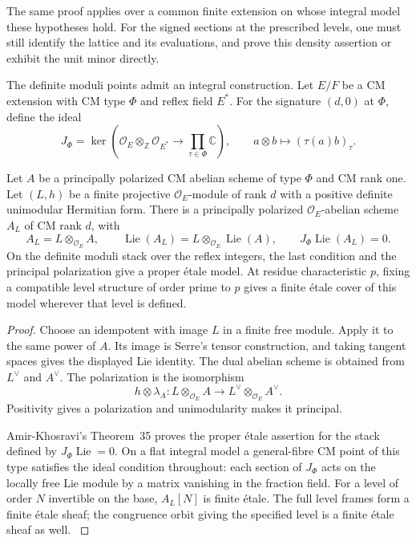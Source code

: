 The same proof applies over a common finite extension on whose integral
model these hypotheses hold. For the signed sections at the prescribed
levels, one must still identify the lattice and its evaluations, and
prove this density assertion or exhibit the unit minor directly.

The definite moduli points admit an integral construction. Let \(E/F\)
be a CM extension with CM type \(\Phi\) and reflex field \(E^*\).
For the signature \((d,0)\) at \(\Phi\), define the ideal
\[
 J_\Phi=\ker\!\left(\mathcal O_E\otimes_{\mathbb Z}\mathcal O_{E^*}
             \longrightarrow\prod_{\tau\in\Phi}\mathbb C\right),
 \qquad a\otimes b\longmapsto(\tau(a)b)_\tau .
\]

\begin{auxlemma}\label{lem:marked-definite-cm-points}
Let \(A\) be a principally polarized CM abelian scheme of type \(\Phi\)
and CM rank one. Let \((L,h)\) be a finite projective
\(\mathcal O_E\)-module of rank \(d\) with a positive definite
unimodular Hermitian form. There is a principally polarized
\(\mathcal O_E\)-abelian scheme \(A_L\) of CM rank \(d\), with
\[
 A_L=L\otimes_{\mathcal O_E}A,\qquad
 \operatorname{Lie}(A_L)=L\otimes_{\mathcal O_E}\operatorname{Lie}(A),
 \qquad J_\Phi\operatorname{Lie}(A_L)=0 .
\]
On the definite moduli stack over the reflex integers, the last
condition and the principal polarization give a proper \'etale model.
At residue characteristic \(p\), fixing a compatible level structure of
order prime to \(p\) gives a finite \'etale cover of this model wherever
that level is defined.
\end{auxlemma}
\begin{proof}
Choose an idempotent with image \(L\) in a finite free module.
Apply it to the same power of \(A\). Its image is Serre's tensor
construction, and taking tangent spaces gives the displayed Lie
identity. The dual abelian scheme is obtained from \(L^\vee\) and
\(A^\vee\). The polarization is the isomorphism
\[
 h\otimes\lambda_A:L\otimes_{\mathcal O_E}A\longrightarrow
 L^\vee\otimes_{\mathcal O_E}A^\vee .
\]
Positivity gives a polarization and unimodularity makes it principal.
\cite[Theorem~17]{amir-khosravi-serre}

Amir-Khosravi's Theorem~35 proves the proper \'etale assertion for the
stack defined by \(J_\Phi\operatorname{Lie}=0\). On a flat integral
model a general-fibre CM point of this type satisfies the ideal
condition throughout: each section of \(J_\Phi\) acts on the locally
free Lie module by a matrix vanishing in the fraction field. For a
level of order \(N\) invertible on the base, \(A_L[N]\) is finite
\'etale. The full level frames form a finite \'etale sheaf; the
congruence orbit giving the specified level is a finite \'etale sheaf
as well. \cite[Theorems~35 and~52]{amir-khosravi-serre}
\end{proof}

